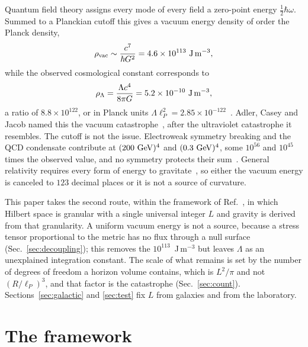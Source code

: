 \documentclass[aps,prd,twocolumn,superscriptaddress,nofootinbib,showkeys]{revtex4-2}
\begin{document}
Quantum field theory assigns every mode of every field a zero-point energy $\tfrac12\hbar\omega$. Summed to a Planckian cutoff this gives a vacuum energy density of order the Planck density,
\begin{equation}
\rho_{\rm vac}\sim\frac{c^7}{\hbar G^2} = 4.6\times10^{113}~{\rm J\,m^{-3}},
\label{eq:rhovac}
\end{equation}
while the observed cosmological constant corresponds to
\begin{equation}
\rho_\Lambda = \frac{\Lambda c^4}{8\pi G} = 5.2\times10^{-10}~{\rm J\,m^{-3}},
\label{eq:rholam}
\end{equation}
a ratio of $8.8\times10^{122}$, or in Planck units $\Lambda\ell_P^2 = 2.85\times10^{-122}$~\cite{weinberg1989,martin2012}. Adler, Casey and Jacob named this the vacuum catastrophe~\cite{adler1995}, after the ultraviolet catastrophe it resembles. The cutoff is not the issue. Electroweak symmetry breaking and the QCD condensate contribute at $(200~{\rm GeV})^4$ and $(0.3~{\rm GeV})^4$, some $10^{56}$ and $10^{45}$ times the observed value, and no symmetry protects their sum~\cite{martin2012}. General relativity requires every form of energy to gravitate~\cite{feynman1995}, so either the vacuum energy is canceled to $123$ decimal places or it is not a source of curvature.

This paper takes the second route, within the framework of Ref.~\cite{korytko2026}, in which Hilbert space is granular with a single universal integer $L$ and gravity is derived from that granularity. A uniform vacuum energy is not a source, because a stress tensor proportional to the metric has no flux through a null surface (Sec.~\ref{sec:decoupling}); this removes the $10^{113}$~J\,m$^{-3}$ but leaves $\Lambda$ as an unexplained integration constant. The scale of what remains is set by the number of degrees of freedom a horizon volume contains, which is $L^2/\pi$ and not $(R/\ell_P)^3$, and that factor is the catastrophe (Sec.~\ref{sec:count}). Sections~\ref{sec:galactic} and \ref{sec:test} fix $L$ from galaxies and from the laboratory.

\section{The framework}
\label{sec:framework}
\end{document}
